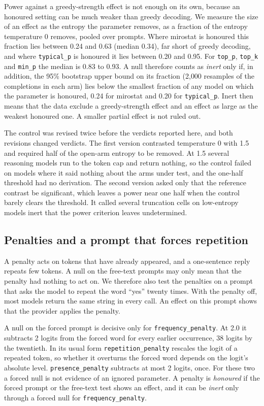 \documentclass[10pt]{article}
\newcommand{\p}[1]{\texttt{#1}}
\begin{document}
Power against a greedy-strength effect is not enough on its own, because an honoured setting can be much weaker than greedy decoding. We measure the size of an effect as the entropy the parameter removes, as a fraction of the entropy temperature 0 removes, pooled over prompts. Where mirostat is honoured this fraction lies between 0.24 and 0.63 (median 0.34), far short of greedy decoding, and where \p{typical\_p} is honoured it lies between 0.20 and 0.95. For \p{top\_p}, \p{top\_k} and \p{min\_p} the median is 0.83 to 0.93. A null therefore counts as \emph{inert} only if, in addition, the 95\% bootstrap upper bound on its fraction (2{,}000 resamples of the completions in each arm) lies below the smallest fraction of any model on which the parameter is honoured, 0.24 for mirostat and 0.20 for \p{typical\_p}. Inert then means that the data exclude a greedy-strength effect and an effect as large as the weakest honoured one. A smaller partial effect is not ruled out.

The control was revised twice before the verdicts reported here, and both revisions changed verdicts. The first version contrasted temperature 0 with 1.5 and required half of the open-arm entropy to be removed. At 1.5 several reasoning models run to the token cap and return nothing, so the control failed on models where it said nothing about the arms under test, and the one-half threshold had no derivation. The second version asked only that the reference contrast be significant, which leaves a power near one half when the control barely clears the threshold. It called several truncation cells on low-entropy models inert that the power criterion leaves undetermined.

\subsection{Penalties and a prompt that forces repetition}

A penalty acts on tokens that have already appeared, and a one-sentence reply repeats few tokens. A null on the free-text prompts may only mean that the penalty had nothing to act on. We therefore also test the penalties on a prompt that asks the model to repeat the word ``yes'' twenty times. With the penalty off, most models return the same string in every call. An effect on this prompt shows that the provider applies the penalty.

A null on the forced prompt is decisive only for \p{frequency\_penalty}. At 2.0 it subtracts 2 logits from the forced word for every earlier occurrence, 38 logits by the twentieth. In its usual form \citep{keskar2019ctrl} \p{repetition\_penalty} rescales the logit of a repeated token, so whether it overturns the forced word depends on the logit's absolute level. \p{presence\_penalty} subtracts at most 2 logits, once. For these two a forced null is not evidence of an ignored parameter. A penalty is \emph{honoured} if the forced prompt or the free-text test shows an effect, and it can be \emph{inert} only through a forced null for \p{frequency\_penalty}.
\end{document}
